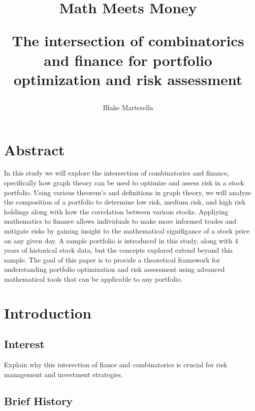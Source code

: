 \documentclass{article}
\begin{document}
\title{
 Math Meets Money \\ 
\begin{large} 
The intersection of combinatorics and finance for portfolio optimization and risk assessment
\end{large} }
\author{Blake Marterella}
\date{}

\maketitle

\section*{Abstract}

In this study we will explore the intersection of combinatorics and finance, specifically how graph theory can be used to optimize and assess risk in a stock portfolio. Using various theorem's and definitions in graph theory, we will analyze the composition of a portfolio to determine low risk, medium risk, and high risk holdings along with how the correlation between various stocks. Appliying mathematics to finance allows individuals to make more informed trades and mitigate risks by gaining insight to the mathematical signifigance of a stock price on any given day. A sample portfolio is introduced in this study, along with 4 years of historical stock data, but the concepts explored extend beyond this sample. The goal of this paper is to provide a theoretical framework for understanding portfolio optimization and risk assessment using advanced mathematical tools that can be applicable to any portfolio.

\tableofcontents

\section{Introduction}

\subsection{Interest}

Explain why this interection of fiance and combinatorics is crucial for risk management and investment strategies.

\subsection{Brief History}
\end{document}
